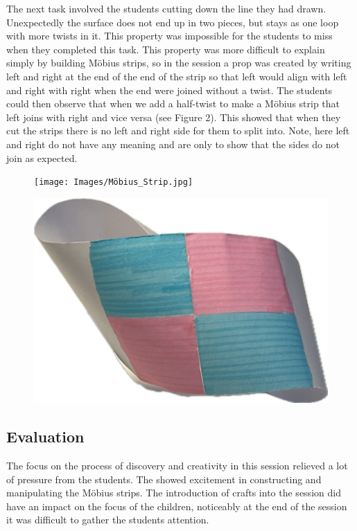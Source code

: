\documentclass[11pt, a4paper, notitlepage]{article}
\begin{document}
\par
The next task involved the students cutting down the line they had drawn. Unexpectedly the surface does not end up in two pieces, but stays as one loop with more twists in it. This property was impossible for the students to miss when they completed this task. This property was more difficult to explain simply by building M\"obius strips, so in the session a prop was created by writing left and right at the end of the end of the strip so that left would align with left and right with right when the end were joined without a twist. The students could then observe that when we add a half-twist to make a M\"obius strip that left joins with right and vice versa (see Figure 2). This showed that when they cut the strips there is no left and right side for them to split into. Note, here left and right do not have any meaning and are only to show that the sides do not join as expected. 

\begin{figure}[htbp]
    \centering
    \begin{minipage}{.48\textwidth}
      \centering
      \texttt{[image: Images/Möbius\_Strip.jpg]}
      \label{fig:test1}
    \end{minipage}%
    \hfill
    \begin{minipage}{.48\textwidth}
      \centering
      \includegraphics[height=.4\linewidth]{Images/coloured_mobius.png}
      \label{fig:test2}
    \end{minipage}
    \end{figure}


\subsection*{Evaluation}
The focus on the process of discovery and creativity in this session relieved a lot of pressure from the students. The showed excitement in constructing and manipulating the M\"obius strips. The introduction of crafts into the session did have an impact on the focus of the children, noticeably at the end of the session it was difficult to gather the students attention.
\end{document}
